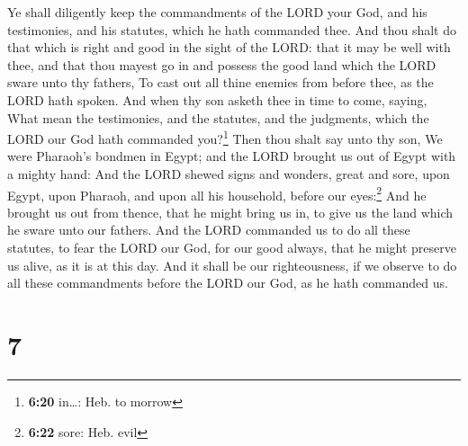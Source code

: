  Ye shall diligently keep the commandments of the LORD
your God, and his testimonies, and his statutes, which he hath commanded
thee.  And thou shalt do that which is right and good in
the sight of the LORD: that it may be well with thee, and that thou
mayest go in and possess the good land which the LORD sware unto thy
fathers,  To cast out all thine enemies from before thee,
as the LORD hath spoken.  And when thy son asketh thee in
time to come, saying, What mean the testimonies, and the statutes, and
the judgments, which the LORD our God hath commanded you?\footnote{\textbf{6:20}
  in\ldots: Heb. to morrow}  Then thou shalt say unto thy
son, We were Pharaoh's bondmen in Egypt; and the LORD brought us out of
Egypt with a mighty hand:  And the LORD shewed signs and
wonders, great and sore, upon Egypt, upon Pharaoh, and upon all his
household, before our eyes:\footnote{\textbf{6:22} sore: Heb. evil}
 And he brought us out from thence, that he might bring
us in, to give us the land which he sware unto our fathers.
 And the LORD commanded us to do all these statutes, to
fear the LORD our God, for our good always, that he might preserve us
alive, as it is at this day.  And it shall be our
righteousness, if we observe to do all these commandments before the
LORD our God, as he hath commanded us.

\hypertarget{section-6}{%
\section{7}\label{section-6}}

